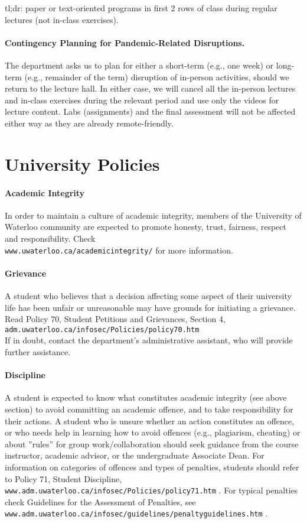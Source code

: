 \documentclass[letterpaper,10pt]{article}
\begin{document}
tl;dr: paper or text-oriented programs in first 2 rows of class during regular lectures (not in-class exercises).

\paragraph{Contingency Planning for Pandemic-Related Disruptions.}
The department asks us to plan for either a short-term (e.g., one week) or long-term (e.g., remainder of the term) disruption of in-person activities, should we return to the lecture hall. In either case, we will cancel all the in-person lectures and in-class exercises during the relevant period and use only the videos for lecture content. Labs (assignments) and the final assessment will not be affected either way as they are already remote-friendly.

\section*{University Policies}

\paragraph{Academic Integrity}
In order to maintain a culture of academic integrity, members of the University of Waterloo community are expected to promote honesty, trust, fairness, respect and responsibility. Check\\
\texttt{www.uwaterloo.ca/academicintegrity/} for more information.

\paragraph{Grievance}
A student who believes that a decision affecting some aspect of their university life has been unfair or unreasonable may have grounds for initiating a grievance. Read Policy 70, Student Petitions and Grievances, Section 4, \texttt{adm.uwaterloo.ca/infosec/Policies/policy70.htm} \\
If in doubt, contact the department's administrative assistant, who will provide further assistance.

\paragraph{Discipline}
A student is expected to know what constitutes academic integrity (see above section) to avoid committing an academic offence, and to take responsibility for their actions. A student who is unsure whether an action constitutes an offence, or who needs help in learning how to avoid offences (e.g., plagiarism, cheating) or about ''rules'' for group work/collaboration should seek guidance from the course instructor, academic advisor, or the undergraduate Associate Dean. For information on categories of offences and types of penalties, students should refer to Policy 71, Student Discipline, \texttt{www.adm.uwaterloo.ca/infosec/Policies/policy71.htm} . For typical penalties check Guidelines for the Assessment of Penalties, see \\\texttt{www.adm.uwaterloo.ca/infosec/guidelines/penaltyguidelines.htm} .
\end{document}
